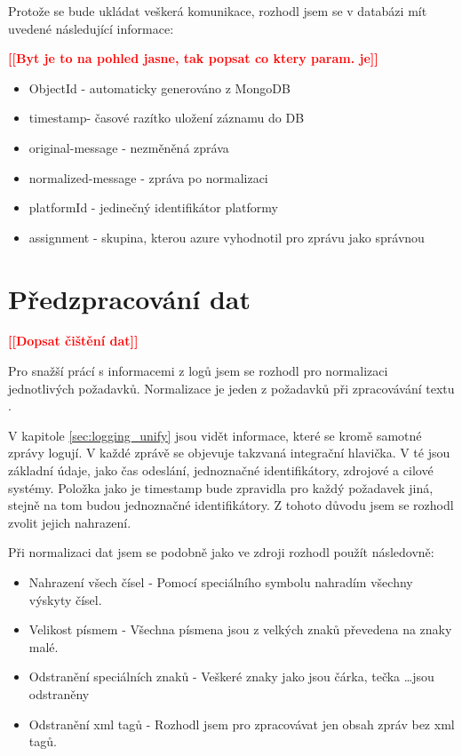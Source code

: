 \documentclass[thesis=M,czech]{FITthesis}[2012/10/20]
\newcommand{\todo}[1]{\textcolor{red}{\textbf{[[#1]]}}}
\begin{document}
		Protože se bude ukládat veškerá komunikace, rozhodl jsem se v databázi mít uvedené následující informace:
		
		\todo{Byt je to na pohled jasne, tak popsat co ktery param. je}
		\begin{itemize} 
			\item ObjectId - automaticky generováno z MongoDB
			\item timestamp- časové razítko uložení záznamu do DB
			\item original-message - nezměněná zpráva
			\item normalized-message - zpráva po normalizaci
			\item platformId - jedinečný identifikátor platformy
			\item assignment - skupina, kterou azure vyhodnotil pro zprávu jako správnou 		
		\end{itemize}
					
	\section{Předzpracování dat}
		\label{sec:preprocessing}
		
		\todo{Dopsat čištění dat}
		
		Pro snažší prácí s informacemi z logů jsem se rozhodl pro normalizaci jednotlivých požadavků. Normalizace je jeden z požadavků při zpracovávání textu \cite{txtNrmlztn}.
		
		V kapitole \ref{sec:logging_unify} jsou vidět informace, které se kromě samotné zprávy logují. V každé zprávě se objevuje takzvaná integrační hlavička. V té jsou základní údaje, jako čas odeslání, jednoznačné identifikátory, zdrojové a cilové systémy. Položka jako je timestamp bude zpravidla pro každý požadavek jiná, stejně na tom budou jednoznačné identifikátory. Z tohoto důvodu jsem se rozhodl zvolit jejich nahrazení.
		
		Při normalizaci dat jsem se podobně jako ve zdroji \cite{Li_2013} rozhodl použít následovně:
		
		\begin{itemize} 
			\item Nahrazení všech čísel - Pomocí speciálního symbolu nahradím všechny výskyty čísel.
			\item Velikost písmem - Všechna písmena jsou z velkých znaků převedena na znaky malé.
			\item Odstranění speciálních znaků - Veškeré znaky jako jsou čárka, tečka \ldots jsou odstraněny
			\item Odstranění xml tagů - Rozhodl jsem pro zpracovávat jen obsah zpráv bez xml tagů.	
		\end{itemize}
	
\end{document}
